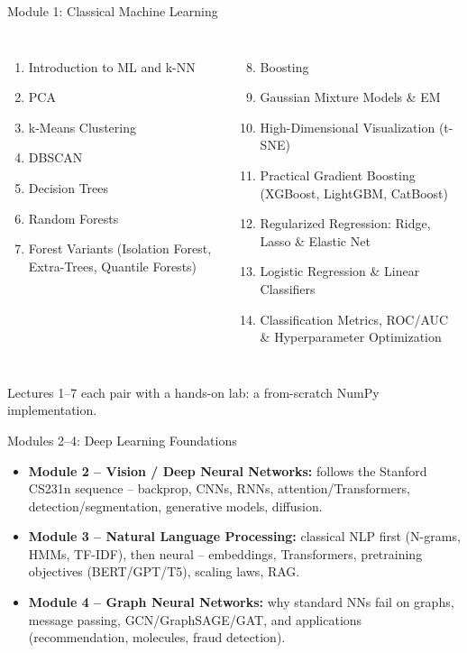 \begin{frame}{Module 1: Classical Machine Learning}
\footnotesize
\begin{columns}[T]
\begin{enumerate}
  \item Introduction to ML and k-NN
  \item PCA
  \item k-Means Clustering
  \item DBSCAN
  \item Decision Trees
  \item Random Forests
  \item Forest Variants (Isolation Forest, Extra-Trees, Quantile Forests)
\end{enumerate}
\begin{enumerate}
  \setcounter{enumi}{7}
  \item Boosting
  \item Gaussian Mixture Models \& EM
  \item High-Dimensional Visualization (t-SNE)
  \item Practical Gradient Boosting (XGBoost, LightGBM, CatBoost)
  \item Regularized Regression: Ridge, Lasso \& Elastic Net
  \item Logistic Regression \& Linear Classifiers
  \item Classification Metrics, ROC/AUC \& Hyperparameter Optimization
\end{enumerate}
\end{columns}
\pause
\begin{rlintuition}
Lectures 1--7 each pair with a hands-on lab: a from-scratch NumPy implementation.
\end{rlintuition}
\end{frame}

\begin{frame}{Modules 2--4: Deep Learning Foundations}
\begin{itemize}
  \item \textbf{Module 2 -- Vision / Deep Neural Networks:} follows the Stanford CS231n sequence -- backprop, CNNs, RNNs, attention/Transformers, detection/segmentation, generative models, diffusion.
  \pause
  \item \textbf{Module 3 -- Natural Language Processing:} classical NLP first (N-grams, HMMs, TF-IDF), then neural -- embeddings, Transformers, pretraining objectives (BERT/GPT/T5), scaling laws, RAG.
  \pause
  \item \textbf{Module 4 -- Graph Neural Networks:} why standard NNs fail on graphs, message passing, GCN/GraphSAGE/GAT, and applications (recommendation, molecules, fraud detection).
\end{itemize}
\end{frame}

